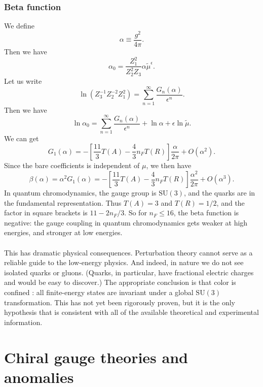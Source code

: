 \subsubsection{Beta function}
We define
\[\alpha \equiv \frac{g^2}{4\pi}.\]
Then we have
\[\alpha_0 = \frac{Z_1^2}{Z_2^2 Z_3} \alpha \tilde{\mu}^{\epsilon}.\]
Let us write
\[\ln \left( Z_3^{-1}Z_2^{-2}Z_1^2 \right) = \sum_{n=1}^{\infty} \frac{G_n(\alpha)}{\epsilon^n}.\]
Then we have
\[\ln \alpha_0 = \sum_{n=1}^{\infty} \frac{G_n(\alpha)}{\epsilon^n} + \ln \alpha + \epsilon \ln \tilde{\mu}.\]
We can get
\[G_1(\alpha) = - \left[ \frac{11}{3}T(A) - \frac{4}{3} n_F T(R) \right] \frac{\alpha}{2\pi} + O(\alpha^2).\]
Since the bare coefficients is independent of $\mu$, we then have
\[\beta(\alpha) = \alpha^2 G_1(\alpha) = - \left[ \frac{11}{3}T(A) - \frac{4}{3} n_F T(R) \right] \frac{\alpha^2}{2\pi} + O(\alpha^3).\]
In quantum chromodynamics, the gauge group is $\mathrm{SU}(3)$, and the quarks are in the fundamental representation. Thus $T(A) = 3$ and $T(R) = {1}/{2}$, and the factor in square brackets is $11 - {2n_F}/{3} $. 
So for $n_F \leq 16$, the beta function is negative: the gauge coupling in quantum chromodynamics gets weaker at high energies, and stronger at low energies.
\\ \\
This has dramatic physical consequences. Perturbation theory cannot serve as a reliable guide to the low-energy physics. And indeed, in nature we do not see isolated quarks or gluons. (Quarks, in particular, have fractional electric charges and would be easy to discover.) The appropriate conclusion is that color is confined : all finite-energy states are invariant under a global $\mathrm{SU}(3)$ transformation. This has not yet been rigorously proven, but it is the
only hypothesis that is consistent with all of the available theoretical and experimental information.

\section{Chiral gauge theories and anomalies}

